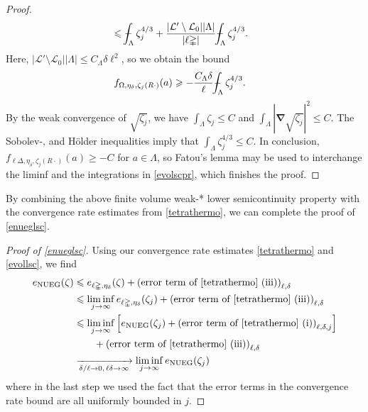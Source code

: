 \documentclass[final,onefignum,onetabnum,reqno]{amsart}
\theoremstyle{remark}
\renewcommand{\le}{\leqslant}
\renewcommand{\ge}{\geqslant}
\newcommand{\NUEG}{\mathrm{NUEG}} %
\newcommand{\grad}{\bm{\nabla}} %
\newcommand{\tetra}{\mathbb{\Delta}} %
\def\Xint#1{\mathchoice
{\XXint\displaystyle\textstyle{#1}}%
{\XXint\textstyle\scriptstyle{#1}}%
{\XXint\scriptstyle\scriptscriptstyle{#1}}%
{\XXint\scriptscriptstyle\scriptscriptstyle{#1}}%
\!\int}
\def\XXint#1#2#3{{\setbox0=\hbox{$#1{#2#3}{\int}$ }
\vcenter{\hbox{$#2#3$ }}\kern-.6\wd0}}
\def\dashint{\Xint-}
\newcommand{\LC}{\mathcal{L}}
\begin{document}
\begin{proof}
\begin{align*}
&\le \dashint_{\Lambda}\zeta_j^{4/3}
+\frac{|\LC'\setminus\LC_0||\Lambda|}{|\ell\tetra|}\dashint_{\Lambda}\zeta_j^{4/3}.
\end{align*}
Here, $|\LC'\setminus\LC_0||\Lambda|\le C_{\Lambda} \delta \ell^2$, so we obtain the bound
\begin{align*}
f_{\Omega,\eta_\delta,\zeta_j(R\cdot)}(a)&\ge - \frac{C_\Lambda\delta}{\ell} \dashint_{\Lambda}\zeta_j^{4/3}.
\end{align*}
By the weak convergence of $\sqrt{\zeta_j}$, we have $\int_\Lambda\zeta_j\le C$ and $\int_\Lambda |\grad\sqrt{\zeta_j}|^2\le C$. The Sobolev-, and H\"older inequalities imply that $\int_\Lambda \zeta_j^{4/3}\le C$. In conclusion, 
$f_{\ell\tetra,\eta_\delta,\zeta_j(R\cdot)}(a)\ge -C$ for $a\in\Lambda$, so Fatou's lemma may be used to interchange the liminf and the integrations in \cref{evolscpr}, 
which finishes the proof.
\end{proof}

By combining the above finite volume weak-* lower semicontinuity property with the convergence rate estimates from \cref{tetrathermo}, we can complete the proof of \cref{enueglsc}.

\begin{proof}[Proof of \cref{enueglsc}]
Using  our convergence rate estimates \cref{tetrathermo} and \cref{evollsc}, we find 
\begin{align*}
e_\NUEG(\zeta)&\le e_{\ell\tetra,\eta_\delta}(\zeta) + \text{(error term of \cref{tetrathermo} (iii))}_{\ell,\delta}\\
&\le \liminf_{j\to\infty} e_{\ell\tetra,\eta_\delta}(\zeta_j) + \text{(error term of \cref{tetrathermo} (iii))}_{\ell,\delta}\\
&\le \liminf_{j\to\infty} \Big[ e_\NUEG(\zeta_j)  + \text{(error term of \cref{tetrathermo} (i))}_{\ell,\delta,j} \Big]\\
&\quad\quad + \text{(error term of \cref{tetrathermo} (iii))}_{\ell,\delta}\\
&\xrightarrow[\delta/\ell\to 0,\,\ell\delta\to\infty]{} \liminf_{j\to\infty} e_\NUEG(\zeta_j)
\end{align*}
where in the last step we used the fact that the error terms in the convergence rate bound are all uniformly bounded in $j$.
\end{proof}



\end{document}
